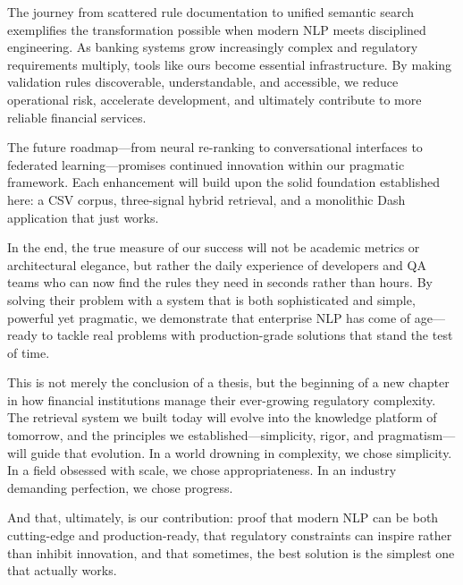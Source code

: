 The journey from scattered rule documentation to unified semantic search exemplifies the transformation possible when modern NLP meets disciplined engineering. As banking systems grow increasingly complex and regulatory requirements multiply, tools like ours become essential infrastructure. By making validation rules discoverable, understandable, and accessible, we reduce operational risk, accelerate development, and ultimately contribute to more reliable financial services.

The future roadmap—from neural re-ranking to conversational interfaces to federated learning—promises continued innovation within our pragmatic framework. Each enhancement will build upon the solid foundation established here: a CSV corpus, three-signal hybrid retrieval, and a monolithic Dash application that just works.

In the end, the true measure of our success will not be academic metrics or architectural elegance, but rather the daily experience of developers and QA teams who can now find the rules they need in seconds rather than hours. By solving their problem with a system that is both sophisticated and simple, powerful yet pragmatic, we demonstrate that enterprise NLP has come of age—ready to tackle real problems with production-grade solutions that stand the test of time.

This is not merely the conclusion of a thesis, but the beginning of a new chapter in how financial institutions manage their ever-growing regulatory complexity. The retrieval system we built today will evolve into the knowledge platform of tomorrow, and the principles we established—simplicity, rigor, and pragmatism—will guide that evolution. In a world drowning in complexity, we chose simplicity. In a field obsessed with scale, we chose appropriateness. In an industry demanding perfection, we chose progress.

And that, ultimately, is our contribution: proof that modern NLP can be both cutting-edge and production-ready, that regulatory constraints can inspire rather than inhibit innovation, and that sometimes, the best solution is the simplest one that actually works.
